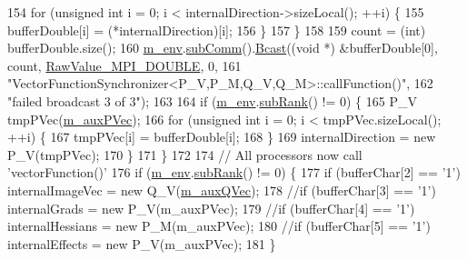 \begin{DoxyCode}
154             \textcolor{keywordflow}{for} (\textcolor{keywordtype}{unsigned} \textcolor{keywordtype}{int} i = 0; i < internalDirection->sizeLocal(); ++i) \{
155               bufferDouble[i] = (*internalDirection)[i];
156             \}
157           \}
158 
159           count = (int) bufferDouble.size();
160           \hyperlink{class_q_u_e_s_o_1_1_vector_function_synchronizer_a36c2a9e1a2d317dddb5cf51b68e5c659}{m\_env}.\hyperlink{class_q_u_e_s_o_1_1_base_environment_affe39f53e3d5d678842413370af09145}{subComm}().\hyperlink{class_q_u_e_s_o_1_1_mpi_comm_abd6af8db8b0c7fd2f5b62e26477a9537}{Bcast}((\textcolor{keywordtype}{void} *) &bufferDouble[0], count, 
      \hyperlink{_mpi_comm_8h_ad0f503bd9fecfe4e570ca3d15aaf2518}{RawValue\_MPI\_DOUBLE}, 0,
161                                 \textcolor{stringliteral}{"VectorFunctionSynchronizer<P\_V,P\_M,Q\_V,Q\_M>::callFunction()"},
162                                 \textcolor{stringliteral}{"failed broadcast 3 of 3"});
163 
164           \textcolor{keywordflow}{if} (\hyperlink{class_q_u_e_s_o_1_1_vector_function_synchronizer_a36c2a9e1a2d317dddb5cf51b68e5c659}{m\_env}.\hyperlink{class_q_u_e_s_o_1_1_base_environment_a172d52f993f1322ed45aaddf71518dbb}{subRank}() != 0) \{
165             P\_V tmpPVec(\hyperlink{class_q_u_e_s_o_1_1_vector_function_synchronizer_af93da0ecec2b078ddacc8135f81cd996}{m\_auxPVec});
166             \textcolor{keywordflow}{for} (\textcolor{keywordtype}{unsigned} \textcolor{keywordtype}{int} i = 0; i < tmpPVec.sizeLocal(); ++i) \{
167               tmpPVec[i] = bufferDouble[i];
168             \}
169             internalDirection = \textcolor{keyword}{new} P\_V(tmpPVec);
170           \}
171         \}
172 
174         \textcolor{comment}{// All processors now call 'vectorFunction()'}
176 \textcolor{comment}{}        \textcolor{keywordflow}{if} (\hyperlink{class_q_u_e_s_o_1_1_vector_function_synchronizer_a36c2a9e1a2d317dddb5cf51b68e5c659}{m\_env}.\hyperlink{class_q_u_e_s_o_1_1_base_environment_a172d52f993f1322ed45aaddf71518dbb}{subRank}() != 0) \{
177           \textcolor{keywordflow}{if} (bufferChar[2] == \textcolor{charliteral}{'1'}) internalImageVec = \textcolor{keyword}{new} Q\_V(\hyperlink{class_q_u_e_s_o_1_1_vector_function_synchronizer_a4fc0f69d67bfcfc200484bb741a2b75d}{m\_auxQVec});
178         \textcolor{comment}{//if (bufferChar[3] == '1') internalGrads    = new P\_V(m\_auxPVec);}
179         \textcolor{comment}{//if (bufferChar[4] == '1') internalHessians = new P\_M(m\_auxPVec);}
180         \textcolor{comment}{//if (bufferChar[5] == '1') internalEffects  = new P\_V(m\_auxPVec);}
181         \}

\end{DoxyCode}
